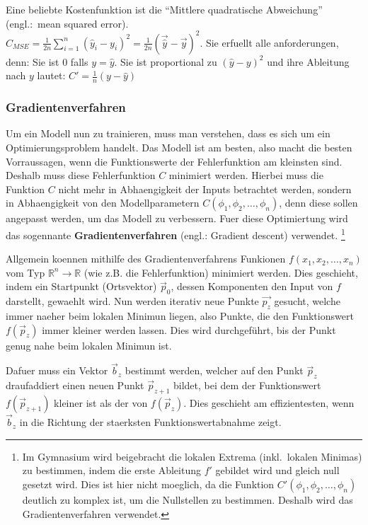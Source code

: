 \documentclass[../main]{subfiles}
\begin{document}
Eine beliebte Kostenfunktion ist die ``Mittlere quadratische Abweichung'' (engl.:\ mean squared error).\\
$\displaystyle C_{MSE} = \frac{1}{2n}\sum_{i=1}^{n}{(\hat{y}_i - y_i)}^2 = \frac{1}{2n}{(\vec{\hat{y}} - \vec{y})}^2$.
Sie erfuellt alle anforderungen, denn:
Sie ist $0$ falls $y=\hat{y}$. Sie ist proportional zu ${(\hat{y}-y)}^2$ und ihre Ableitung nach $y$ lautet: $C'=\frac{1}{n}(y-\hat{y})$


\subsubsection{Gradientenverfahren}
Um ein Modell nun zu trainieren, muss man verstehen, dass es sich um ein Optimierungsproblem handelt.
Das Modell ist am besten, also macht die besten Vorraussagen, wenn die
Funktionswerte der Fehlerfunktion am kleinsten sind.
Deshalb muss diese Fehlerfunktion $C$ minimiert werden.
Hierbei muss die Funktion $C$ nicht mehr in Abhaengigkeit der Inputs betrachtet werden, sondern in Abhaengigkeit von den Modellparametern
$C(\phi_1, \phi_2, \ldots, \phi_n)$, denn diese sollen angepasst werden, um das Modell zu verbessern.
Fuer diese Optimiertung wird das sogennante \textbf{Gradientenverfahren} (engl.: Gradient descent) verwendet.
\footnote{
  Im Gymnasium wird beigebracht die lokalen Extrema (inkl.\ lokalen Minimas) zu bestimmen, indem die erste Ableitung $f'$ gebildet wird und  gleich null gesetzt wird.
  Dies ist hier nicht moeglich, da die Funktion $C'(\phi_1,\phi_2, \ldots, \phi_n)$ deutlich zu komplex ist, um die Nullstellen zu bestimmen. Deshalb wird das Gradientenverfahren verwendet.
}
\par\medskip
Allgemein koennen mithilfe des Gradientenverfahrens Funkionen $f(x_1, x_2, \ldots, x_n)$ vom Typ $\mathbb{R}^n \to \mathbb{R}$ (wie z.B. die Fehlerfunktion) minimiert werden.
Dies geschieht, indem ein Startpunkt (Ortsvektor) $\vec{p}_0$, dessen Komponenten den Input von $f$ darstellt, gewaehlt wird.
Nun werden iterativ neue Punkte $\vec{p_z}$ gesucht, welche immer naeher beim lokalen Minimun liegen, also Punkte, die den Funktionswert $f(\vec{p}_z)$ immer kleiner werden lassen.
Dies wird durchgeführt, bis der Punkt genug nahe beim lokalen Minimun ist.
\par\medskip
Dafuer muss ein Vektor $\vec{b}_z$ bestimmt werden, welcher auf den Punkt $\vec{p}_z$ draufaddiert einen neuen Punkt $\vec{p}_{z+1}$ bildet,
bei dem der Funktionswert $f(\vec{p}_{z+1})$ kleiner ist als der von $f(\vec{p}_z)$.
Dies geschieht am effizientesten, wenn $\vec{b}_z$ in die Richtung der staerksten Funktionswertabnahme zeigt.
\end{document}
